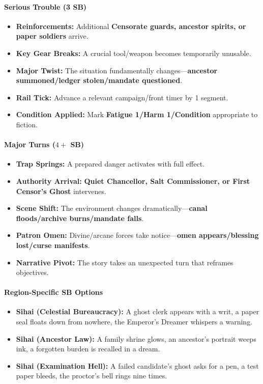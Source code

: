 \paragraph{Serious Trouble (3 SB)}
\begin{itemize}
\item \textbf{Reinforcements:} Additional \textbf{Censorate guards, ancestor spirits, or paper soldiers} arrive.
\item \textbf{Key Gear Breaks:} A crucial tool/weapon becomes temporarily unusable.
\item \textbf{Major Twist:} The situation fundamentally changes---\textbf{ancestor summoned/ledger stolen/mandate questioned}.
\item \textbf{Rail Tick:} Advance a relevant campaign/front timer by 1 segment.
\item \textbf{Condition Applied:} Mark \textbf{Fatigue 1/Harm 1/Condition} appropriate to fiction.
\end{itemize}

\paragraph{Major Turns ($4+$ SB)}
\begin{itemize}
\item \textbf{Trap Springs:} A prepared danger activates with full effect.
\item \textbf{Authority Arrival:} \textbf{Quiet Chancellor, Salt Commissioner, or First Censor's Ghost} intervenes.
\item \textbf{Scene Shift:} The environment changes dramatically---\textbf{canal floods/archive burns/mandate falls}.
\item \textbf{Patron Omen:} Divine/arcane forces take notice---\textbf{omen appears/blessing lost/curse manifests}.
\item \textbf{Narrative Pivot:} The story takes an unexpected turn that reframes objectives.
\end{itemize}

\paragraph{Region-Specific SB Options}
\begin{itemize}
\item \textbf{Sihai (Celestial Bureaucracy):} A ghost clerk appears with a writ, a paper seal floats down from nowhere, the Emperor's Dreamer whispers a warning.
\item \textbf{Sihai (Ancestor Law):} A family shrine glows, an ancestor's portrait weeps ink, a forgotten burden is recalled in a dream.
\item \textbf{Sihai (Examination Hell):} A failed candidate's ghost asks for a pen, a test paper bleeds, the proctor's bell rings nine times.
\end{itemize}

